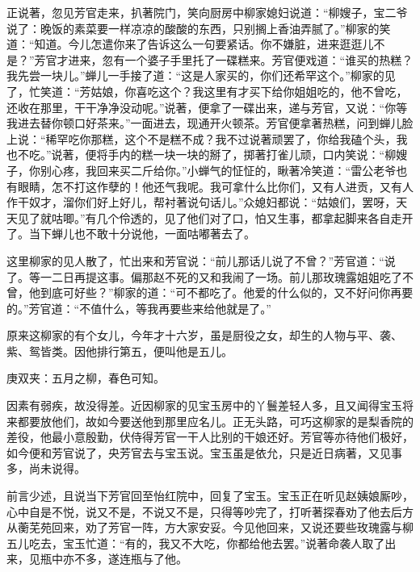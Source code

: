 \begin{parag}
    正说著，忽见芳官走来，扒著院门，笑向厨房中柳家媳妇说道：“柳嫂子，宝二爷说了：晚饭的素菜要一样凉凉的酸酸的东西，只别搁上香油弄腻了。”柳家的笑道：“知道。今儿怎遣你来了告诉这么一句要紧话。你不嫌脏，进来逛逛儿不是？”芳官才进来，忽有一个婆子手里托了一碟糕来。芳官便戏道：“谁买的热糕？我先尝一块儿。”蝉儿一手接了道：“这是人家买的，你们还希罕这个。”柳家的见了，忙笑道：“芳姑娘，你喜吃这个？我这里有才买下给你姐姐吃的，他不曾吃，还收在那里，干干净净没动呢。”说著，便拿了一碟出来，递与芳官，又说：“你等我进去替你顿口好茶来。”一面进去，现通开火顿茶。芳官便拿著热糕，问到蝉儿脸上说：“稀罕吃你那糕，这个不是糕不成？我不过说著顽罢了，你给我磕个头，我也不吃。”说著，便将手内的糕一块一块的掰了，掷著打雀儿顽，口内笑说：“柳嫂子，你别心疼，我回来买二斤给你。”小蝉气的怔怔的，瞅著冷笑道：“雷公老爷也有眼睛，怎不打这作孽的！他还气我呢。我可拿什么比你们，又有人进贡，又有人作干奴才，溜你们好上好儿，帮衬著说句话儿。”众媳妇都说：“姑娘们，罢呀，天天见了就咕唧。”有几个伶透的，见了他们对了口，怕又生事，都拿起脚来各自走开了。当下蝉儿也不敢十分说他，一面咕嘟著去了。
\end{parag}


\begin{parag}
    这里柳家的见人散了，忙出来和芳官说：“前儿那话儿说了不曾？”芳官道：“说了。等一二日再提这事。偏那赵不死的又和我闹了一场。前儿那玫瑰露姐姐吃了不曾，他到底可好些？”柳家的道：“可不都吃了。他爱的什么似的，又不好问你再要的。”芳官道：“不值什么，等我再要些来给他就是了。”
\end{parag}


\begin{parag}
    原来这柳家的有个女儿，今年才十六岁，虽是厨役之女，却生的人物与平、袭、紫、鸳皆类。因他排行第五，便叫他是五儿。\begin{note}庚双夹：五月之柳，春色可知。\end{note}因素有弱疾，故没得差。近因柳家的见宝玉房中的丫鬟差轻人多，且又闻得宝玉将来都要放他们，故如今要送他到那里应名儿。正无头路，可巧这柳家的是梨香院的差役，他最小意殷勤，伏侍得芳官一干人比别的干娘还好。芳官等亦待他们极好，如今便和芳官说了，央芳官去与宝玉说。宝玉虽是依允，只是近日病著，又见事多，尚未说得。
\end{parag}


\begin{parag}
    前言少述，且说当下芳官回至怡红院中，回复了宝玉。宝玉正在听见赵姨娘厮吵，心中自是不悦，说又不是，不说又不是，只得等吵完了，打听著探春劝了他去后方从蘅芜苑回来，劝了芳官一阵，方大家安妥。今见他回来，又说还要些玫瑰露与柳五儿吃去，宝玉忙道：“有的，我又不大吃，你都给他去罢。”说著命袭人取了出来，见瓶中亦不多，遂连瓶与了他。
\end{parag}


